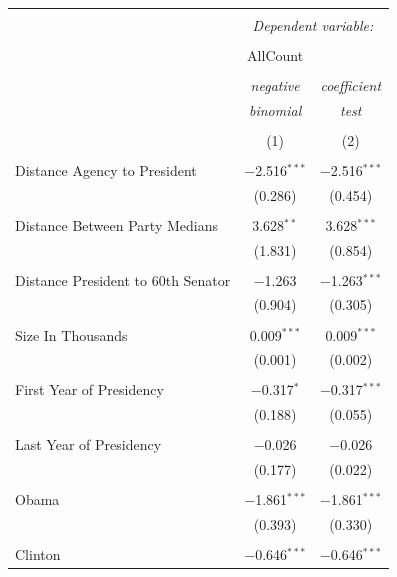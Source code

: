 \documentclass[12pt]{article}
\begin{document}
\begin{table}[!htbp] \centering 
  \caption{} 
  \label{} 
\begin{tabular}{@{\extracolsep{5pt}}lcc} 
\\[-1.8ex]\hline 
\hline \\[-1.8ex] 
 & \multicolumn{2}{c}{\textit{Dependent variable:}} \\ 
\cline{2-3} 
\\[-1.8ex] & AllCount &   \\ 
\\[-1.8ex] & \textit{negative} & \textit{coefficient} \\ 
 & \textit{binomial} & \textit{test} \\ 
\\[-1.8ex] & (1) & (2)\\ 
\hline \\[-1.8ex] 
 Distance Agency to President & $-$2.516$^{***}$ & $-$2.516$^{***}$ \\ 
  & (0.286) & (0.454) \\ 
  & & \\ 
 Distance Between Party Medians & 3.628$^{**}$ & 3.628$^{***}$ \\ 
  & (1.831) & (0.854) \\ 
  & & \\ 
 Distance President to 60th Senator & $-$1.263 & $-$1.263$^{***}$ \\ 
  & (0.904) & (0.305) \\ 
  & & \\ 
 Size In Thousands & 0.009$^{***}$ & 0.009$^{***}$ \\ 
  & (0.001) & (0.002) \\ 
  & & \\ 
 First Year of Presidency & $-$0.317$^{*}$ & $-$0.317$^{***}$ \\ 
  & (0.188) & (0.055) \\ 
  & & \\ 
 Last Year of Presidency & $-$0.026 & $-$0.026 \\ 
  & (0.177) & (0.022) \\ 
  & & \\ 
 Obama & $-$1.861$^{***}$ & $-$1.861$^{***}$ \\ 
  & (0.393) & (0.330) \\ 
  & & \\ 
 Clinton & $-$0.646$^{***}$ & $-$0.646$^{***}$ \\ 

\end{tabular}
\end{table}
\end{document}
